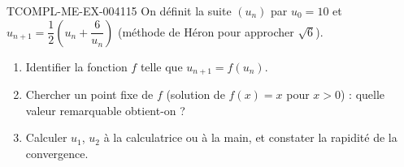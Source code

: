\begin{exercice}{TCOMPL-ME-EX-004}{1}{15}
On définit la suite $(u_n)$ par $u_0 = 10$ et $u_{n+1} = \dfrac{1}{2}\left(u_n + \dfrac{6}{u_n}\right)$ (méthode de Héron pour approcher $\sqrt{6}$).
\begin{enumerate}
  \item Identifier la fonction $f$ telle que $u_{n+1}=f(u_n)$.
  \item Chercher un point fixe de $f$ (solution de $f(x)=x$ pour $x>0$) : quelle valeur remarquable obtient-on ?
  \item Calculer $u_1$, $u_2$ à la calculatrice ou à la main, et constater la rapidité de la convergence.
\end{enumerate}
\end{exercice}
